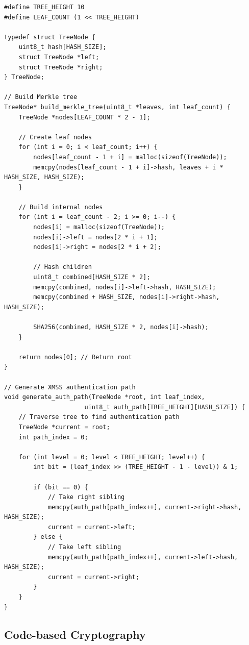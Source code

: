 \begin{lstlisting}[style=cstyle, caption={XMSS Tree Building}]
#define TREE_HEIGHT 10
#define LEAF_COUNT (1 << TREE_HEIGHT)

typedef struct TreeNode {
    uint8_t hash[HASH_SIZE];
    struct TreeNode *left;
    struct TreeNode *right;
} TreeNode;

// Build Merkle tree
TreeNode* build_merkle_tree(uint8_t *leaves, int leaf_count) {
    TreeNode *nodes[LEAF_COUNT * 2 - 1];
    
    // Create leaf nodes
    for (int i = 0; i < leaf_count; i++) {
        nodes[leaf_count - 1 + i] = malloc(sizeof(TreeNode));
        memcpy(nodes[leaf_count - 1 + i]->hash, leaves + i * HASH_SIZE, HASH_SIZE);
    }
    
    // Build internal nodes
    for (int i = leaf_count - 2; i >= 0; i--) {
        nodes[i] = malloc(sizeof(TreeNode));
        nodes[i]->left = nodes[2 * i + 1];
        nodes[i]->right = nodes[2 * i + 2];
        
        // Hash children
        uint8_t combined[HASH_SIZE * 2];
        memcpy(combined, nodes[i]->left->hash, HASH_SIZE);
        memcpy(combined + HASH_SIZE, nodes[i]->right->hash, HASH_SIZE);
        
        SHA256(combined, HASH_SIZE * 2, nodes[i]->hash);
    }
    
    return nodes[0]; // Return root
}

// Generate XMSS authentication path
void generate_auth_path(TreeNode *root, int leaf_index, 
                      uint8_t auth_path[TREE_HEIGHT][HASH_SIZE]) {
    // Traverse tree to find authentication path
    TreeNode *current = root;
    int path_index = 0;
    
    for (int level = 0; level < TREE_HEIGHT; level++) {
        int bit = (leaf_index >> (TREE_HEIGHT - 1 - level)) & 1;
        
        if (bit == 0) {
            // Take right sibling
            memcpy(auth_path[path_index++], current->right->hash, HASH_SIZE);
            current = current->left;
        } else {
            // Take left sibling
            memcpy(auth_path[path_index++], current->left->hash, HASH_SIZE);
            current = current->right;
        }
    }
}
\end{lstlisting}

\subsection{Code-based Cryptography}

